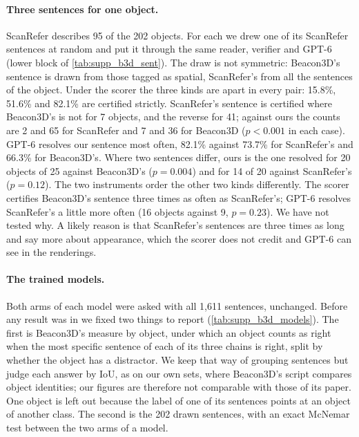 \paragraph{Three sentences for one object.}
ScanRefer describes 95 of the 202 objects.
For each we drew one of its ScanRefer sentences at random and put it through the same reader, verifier and GPT-6 (lower block of \cref{tab:supp_b3d_sent}).
The draw is not symmetric: Beacon3D's sentence is drawn from those tagged as spatial, ScanRefer's from all the sentences of the object.
Under the scorer the three kinds are apart in every pair: 15.8\%, 51.6\% and 82.1\% are certified strictly.
ScanRefer's sentence is certified where Beacon3D's is not for 7 objects, and the reverse for 41; against ours the counts are 2 and 65 for ScanRefer and 7 and 36 for Beacon3D ($p < 0.001$ in each case).
GPT-6 resolves our sentence most often, 82.1\% against 73.7\% for ScanRefer's and 66.3\% for Beacon3D's.
Where two sentences differ, ours is the one resolved for 20 objects of 25 against Beacon3D's ($p = 0.004$) and for 14 of 20 against ScanRefer's ($p = 0.12$).
The two instruments order the other two kinds differently.
The scorer certifies Beacon3D's sentence three times as often as ScanRefer's; GPT-6 resolves ScanRefer's a little more often (16 objects against 9, $p = 0.23$).
We have not tested why.
A likely reason is that ScanRefer's sentences are three times as long and say more about appearance, which the scorer does not credit and GPT-6 can see in the renderings.


\paragraph{The trained models.}
Both arms of each model were asked with all 1,611 sentences, unchanged.
Before any result was in we fixed two things to report (\cref{tab:supp_b3d_models}).
The first is Beacon3D's measure by object, under which an object counts as right when the most specific sentence of each of its three chains is right, split by whether the object has a distractor.
We keep that way of grouping sentences but judge each answer by IoU, as on our own sets, where Beacon3D's script compares object identities; our figures are therefore not comparable with those of its paper.
One object is left out because the label of one of its sentences points at an object of another class.
The second is the 202 drawn sentences, with an exact McNemar test between the two arms of a model.

